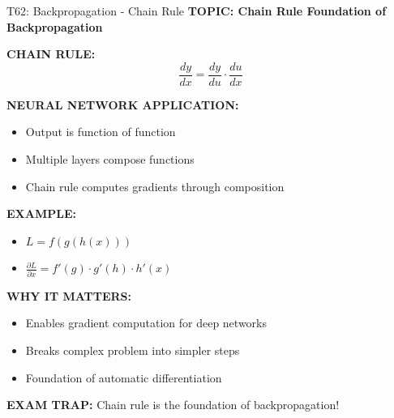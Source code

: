 \documentclass[8pt]{beamer}
\begin{document}
	\begin{frame}{T62: Backpropagation - Chain Rule}
		\fontsize{6.5}{7.5}\selectfont
		\textbf{TOPIC: Chain Rule Foundation of Backpropagation}
		
		\vspace{0.1cm}
		\textbf{CHAIN RULE:}
		\[
		\frac{dy}{dx} = \frac{dy}{du} \cdot \frac{du}{dx}
		\]
		
		\vspace{0.1cm}
		\textbf{NEURAL NETWORK APPLICATION:}
		\begin{itemize}
			\item Output is function of function
			\item Multiple layers compose functions
			\item Chain rule computes gradients through composition
		\end{itemize}
		
		\vspace{0.1cm}
		\textbf{EXAMPLE:}
		\begin{itemize}
			\item $L = f(g(h(x)))$
			\item $\frac{\partial L}{\partial x} = f'(g) \cdot g'(h) \cdot h'(x)$
		\end{itemize}
		
		\vspace{0.1cm}
		\textbf{WHY IT MATTERS:}
		\begin{itemize}
			\item Enables gradient computation for deep networks
			\item Breaks complex problem into simpler steps
			\item Foundation of automatic differentiation
		\end{itemize}
		
		\textcolor{myred}{\textbf{EXAM TRAP:}} Chain rule is the \textcolor{myblue}{foundation} of backpropagation!
	\end{frame}
	
\end{document}
